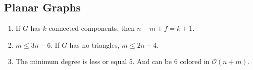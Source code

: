 \subsection{Planar Graphs}
\begin{enumerate}
\item If $G$ has $k$ connected components, then $n - m + f = k + 1$.
\item $m \leq  3n - 6 $. If $G$ has no triangles, $m \leq 2n - 4$.
\item The minimum degree is less or equal 5. And can be $6$ colored in $\mathcal{O}(n+m)$.
\end{enumerate}
